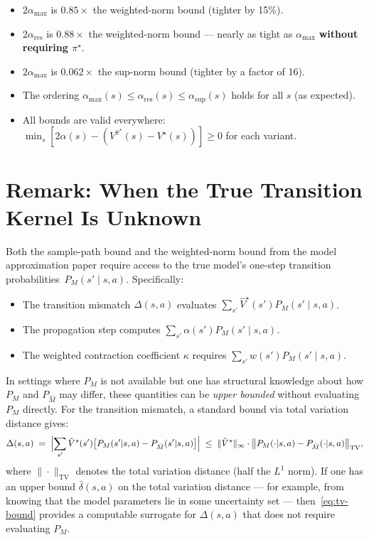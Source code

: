 \documentclass[11pt]{article}
\newcommand{\pistar}{\pi^\star}
\newcommand{\pihatstar}{\hat\pi^\star}
\newcommand{\Vstar}{V^\star}
\newcommand{\Vhatstar}{\hat V^\star}
\newcommand{\Vpihat}{V^{\pihatstar}}
\newcommand{\alphares}{\alpha_{\mathrm{res}}}
\begin{document}
\begin{itemize}
  \item $2\alpha_{\max}$ is $\mathbf{0.85\times}$ the weighted-norm bound
        (tighter by 15\%).
  \item $2\alphares$ is $\mathbf{0.88\times}$ the weighted-norm bound ---
        nearly as tight as $\alpha_{\max}$ \textbf{without requiring $\pistar$}.
  \item $2\alpha_{\max}$ is $\mathbf{0.062\times}$ the sup-norm bound (tighter
        by a factor of 16).
  \item The ordering $\alpha_{\max}(s) \le \alphares(s) \le \alpha_{\sup}(s)$
        holds for all $s$ (as expected).
  \item All bounds are valid everywhere: $\min_s [2\alpha(s) - (\Vpihat(s)
        - \Vstar(s))] \ge 0$ for each variant.
\end{itemize}

\section{Remark: When the True Transition Kernel Is Unknown}

Both the sample-path bound and the weighted-norm bound from the model
approximation paper require access to the true model's one-step transition
probabilities~$P_M(s' \mid s, a)$.  Specifically:
\begin{itemize}
  \item The transition mismatch $\Delta(s,a)$ evaluates
        $\sum_{s'} \Vhatstar(s') P_M(s' \mid s, a)$.
  \item The propagation step computes
        $\sum_{s'} \alpha(s') P_M(s' \mid s, a)$.
  \item The weighted contraction coefficient $\kappa$ requires
        $\sum_{s'} w(s') P_M(s' \mid s, a)$.
\end{itemize}

In settings where $P_M$ is not available but one has structural knowledge
about how $P_M$ and $P_{\hat M}$ may differ, these quantities can be
\emph{upper bounded} without evaluating $P_M$ directly.  For the transition
mismatch, a standard bound via total variation distance gives:
\begin{equation}\label{eq:tv-bound}
  \Delta(s,a)
  \;=\; \Bigl|\sum_{s'} \Vhatstar(s')\bigl[P_M(s'|s,a) - P_{\hat M}(s'|s,a)\bigr]\Bigr|
  \;\le\; \|\Vhatstar\|_\infty \cdot
          \bigl\|P_M(\cdot|s,a) - P_{\hat M}(\cdot|s,a)\bigr\|_{\mathrm{TV}},
\end{equation}
where $\|\cdot\|_{\mathrm{TV}}$ denotes the total variation distance (half the
$L^1$ norm).  If one has an upper bound $\bar\delta(s,a)$ on the total
variation distance --- for example, from knowing that the model parameters lie
in some uncertainty set --- then~\eqref{eq:tv-bound} provides a computable
surrogate for $\Delta(s,a)$ that does not require evaluating $P_M$.
\end{document}

